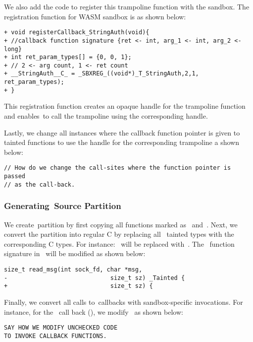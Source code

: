 We also add the code to register this trampoline function with the sandbox. The registration function for WASM sandbox is as shown below:
\begin{verbatim}
+ void registerCallback_StringAuth(void){
+ //callback function signature {ret <- int, arg_1 <- int, arg_2 <- long}
+ int ret_param_types[] = {0, 0, 1};
+ // 2 <- arg count, 1 <- ret count
+ __StringAuth__C_ = _SBXREG_((void*)_T_StringAuth,2,1, ret_param_types);
+ }
\end{verbatim}
This registration function creates an opaque handle for the trampoline function and enables~\ucregion to call the trampoline using the corresponding handle.

Lastly, we change all instances where the callback function pointer is given to tainted functions to use the handle for the corresponding trampoline a shown below:
\begin{verbatim}
// How do we change the call-sites where the function pointer is passed
// as the call-back.
\end{verbatim}

\subsubsection{Generating~\ucregion Source Partition}
\label{subsubsec:genucregion}
We create~\ucregion partition by first copying all functions marked as~ and~.
Next, we convert the partition into regular C by replacing all~\systemname{} tainted types with the corresponding C types.
For instance:~ will be replaced with~.
The~ function signature in~ will be modified as shown below:
\begin{verbatim}
size_t read_msg(int sock_fd, char *msg,
-                             size_t sz) _Tainted {
+                             size_t sz) {
\end{verbatim}

Finally, we convert all calls to~\cregion callbacks with sandbox-specific invocations. For instance, for the~ call back (), we modify~ as shown below:
\begin{verbatim}
SAY HOW WE MODIFY UNCHECKED CODE
TO INVOKE CALLBACK FUNCTIONS.
\end{verbatim}


